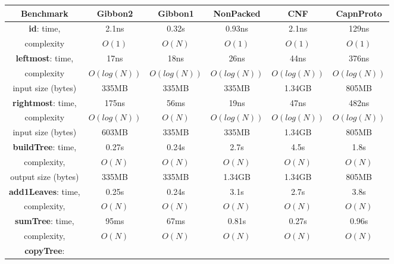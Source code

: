 \documentclass[showabstract,showacknowledgments,showpreface,showdedication,school]{iuphd}
\theoremstyle{nonumberplain}
\begin{document}
 \begin{table}
  \begin{center}
    \small
      \begin{tabular}{ |c|c|c|c|c|c| }
        \hline
        Benchmark & Gibbon2 & Gibbon1 & NonPacked & CNF & CapnProto\hspace{-1mm} \\
        \hline
        
        {\bf id}:
        time, & 2.1ns &  0.32s  &  0.93ns &  2.1ns   & 129ns  \\
        complexity   & $O(1)$   &  $O(N)$ & $O(1)$    &  $O(1)$  & $O(1)$  \\
        \hline

        
        {\bf leftmost}:
        time,        & 17ns         & 18ns        & 26ns        &    44ns      & 376ns            \\
        complexity   & $O(log(N))$  & $O(log(N))$ & $O(log(N))$ & $O(log(N))$  & $O(log(N))$ \\
        input size (bytes) & 335MB  & 335MB       & 335MB       &    1.34GB    & 805MB             \\
        \hline

        {\bf rightmost}:
        time,        & 175ns        & 56ms    & 19ns        &    47ns      & 482ns \\
        complexity   & $O(log(N))$  & $O(N)$  & $O(log(N))$ & $O(log(N))$  & $O(log(N))$  \\
        input size (bytes) & 603MB & 335MB    & 335MB       &    1.34GB    & 805MB            \\
        \hline

        {\bf buildTree}:
        time,               & 0.27s     &  0.24s    & 2.7s &  4.5s  & 1.8s   \\
        complexity,         & $O(N)$    &  $O(N)$   &  $O(N)$ & $O(N)$  &  $O(N)$ \\
        output size (bytes) & 335MB     &  335MB    &  1.34GB &  1.34GB &  805MB       \\
        \hline

        {\bf add1Leaves}:
        time,               & 0.25s     &  0.24s  & 3.1s     & 2.7s    &  3.8s  \\
        complexity,         & $O(N)$    &  $O(N)$ & $O(N)$   & $O(N)$  &  $O(N)$ \\
        \hline
        {\bf sumTree}:
            time,               & 95ms     & 67ms     & 0.81s   &  0.27s  &  0.96s  \\
            complexity,         & $O(N)$   & $O(N)$   & $O(N)$  & $O(N)$  &  $O(N)$ \\
            \hline
            {\bf copyTree}:


\end{tabular}
\end{center}
\end{table}
\end{document}
